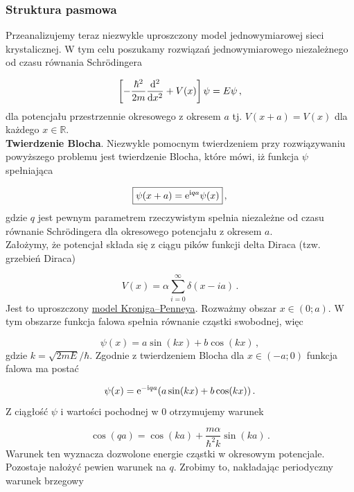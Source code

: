 \documentclass{myclass}
\begin{document}
\subsubsection{Struktura pasmowa}

Przeanalizujemy teraz niezwykle uproszczony model jednowymiarowej sieci krystalicznej. W tym celu
poszukamy rozwiązań jednowymiarowego niezależnego od czasu równania Schr{\"o}dingera

\begin{equation*}
\left[-\frac{\hbar^2}{2m}\dv[2]{}{x}+V(x)\right]\psi=E\psi\,,
\end{equation*}
dla potencjału przestrzennie okresowego z okresem \(a\) tj. \(V(x+a)=V(x)\) dla każdego
\(x\in\mathbb{R}\).\\

\textbf{Twierdzenie Blocha}. Niezwykle pomocnym twierdzeniem przy rozwiązywaniu powyższego problemu
jest twierdzenie Blocha, które mówi, iż funkcja \(\psi\) spełniająca

\begin{equation*}
\boxed{\psi(x+a)=\mathrm{e}^{\mathrm{i} qa}\psi(x)}\,,
\end{equation*}
gdzie \(q\) jest pewnym parametrem rzeczywistym spełnia niezależne od czasu równanie
Schr{\"o}dingera dla okresowego potencjału z okresem \(a\).\\

Założymy, że potencjał składa się z ciągu pików funkcji delta Diraca (tzw. grzebień Diraca)

\begin{equation*}
V(x)=\alpha\sum_{i=0}^{\infty}\delta(x-ia)\,.
\end{equation*}
Jest to uproszczony \underline{model Kroniga--Penneya}. Rozważmy obszar \(x\in(0;a)\). W tym
obszarze funkcja falowa spełnia równanie cząstki swobodnej, więc

\begin{equation*}
\psi(x)=a\sin (kx)+b\cos(kx)\,,
\end{equation*}
gdzie \(k=\sqrt{2mE}/\hbar\). Zgodnie z twierdzeniem Blocha dla \(x\in(-a;0)\) funkcja falowa ma
postać

\begin{equation*}
\psi(x)=\mathrm{e}^{-\mathrm{i} qa}(a\sin (kx)+b\cos(kx))\,.
\end{equation*}
Z ciągłość \(\psi\) i wartości pochodnej w 0 otrzymujemy warunek

\begin{equation*}
\cos(qa)=\cos(ka)+\frac{m\alpha}{\hbar^2k}\sin(ka)\,.
\end{equation*}
Warunek ten wyznacza dozwolone energie cząstki w okresowym potencjale. Pozostaje nałożyć pewien
warunek na \(q\). Zrobimy to, nakładając periodyczny warunek brzegowy
\end{document}
